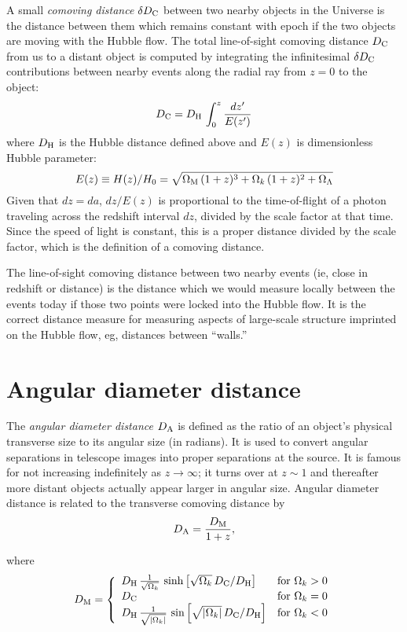 A small {\em comoving distance\/} $\delta D_{\rm C}$ between two
nearby objects in the Universe is the distance between them which
remains constant with epoch if the two objects are moving with the
Hubble flow. 
The total line-of-sight comoving distance $D_{\rm C}$ from us to a
distant object is computed by integrating the infinitesimal $\delta
D_{\rm C}$ contributions between nearby events along the radial ray
from $z=0$ to the object:
\begin{equation}
D_{\rm C} = D_{\rm H}\,\int_0^z\frac{dz'}{E(z')}
\end{equation}
where $D_{\rm H}$ is the Hubble distance defined above and $E(z)$ is dimensionless Hubble parameter:
\begin{equation}
E(z)\equiv H(z)/H_0=\sqrt{\Omega_{\rm M}\,(1+z)^3+\Omega_k\,(1+z)^2+\Omega_{\Lambda}}
\end{equation}
Given that $dz=da$, $dz/E(z)$ is proportional to the
time-of-flight of a photon traveling across the redshift interval
$dz$, divided by the scale factor at that time.  Since the speed of
light is constant, this is a proper distance divided by the scale
factor, which is the definition of a comoving distance. 

The line-of-sight
comoving distance between two nearby events (ie, close in redshift or
distance) is the distance which we would measure locally between the
events today if those two points were locked into the Hubble flow.  It
is the correct distance measure for measuring aspects of large-scale
structure imprinted on the Hubble flow, eg, distances between
``walls.''

\section{Angular diameter distance}

The {\it angular diameter distance\/} $D_{\rm A}$ is defined as the
ratio of an object's physical transverse size to its angular size (in
radians).  It is used to convert angular separations in telescope
images into proper separations at the source.  It is famous for not
increasing indefinitely as $z\rightarrow\infty$; it turns over at
$z\sim 1$ and thereafter more distant objects actually appear larger
in angular size.  Angular diameter distance is related to the
transverse comoving distance by
\begin{equation}
D_{\rm A} = \frac{D_{\rm M}}{1+z}, 
\end{equation}

where 
\begin{equation}
D_{\rm M} = \left\{
\begin{array}{ll}
D_{\rm H}\,\frac{1}{\sqrt{\Omega_k}}\,\sinh\left[\sqrt{\Omega_k}\,D_{\rm C}/D_{\rm H}\right] & {\rm for}~\Omega_k>0 \\
D_{\rm C} & {\rm for}~\Omega_k=0 \\
D_{\rm H}\,\frac{1}{\sqrt{|\Omega_k|}}\,\sin\left[\sqrt{|\Omega_k|}\,D_{\rm C}/D_{\rm H}\right] & {\rm for}~\Omega_k<0
\end{array}
\right.
\end{equation}

